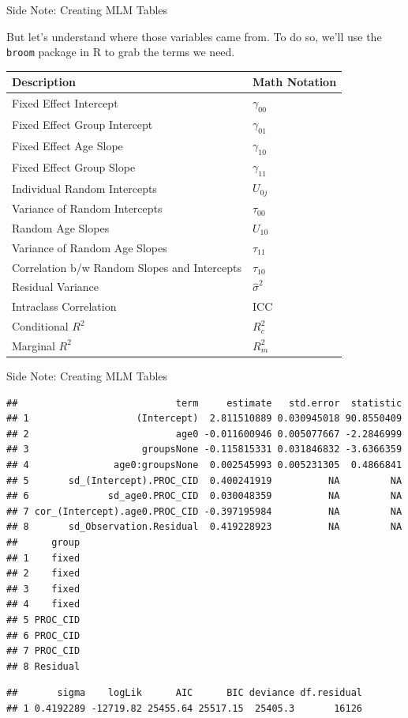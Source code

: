 \begin{frame}[fragile]{Side Note: Creating MLM Tables}

But let's understand where those variables came from. To do so, we'll
use the \texttt{broom} package in R to grab the terms we need.

\begin{longtable}[]{@{}ll@{}}
\toprule
Description & Math Notation\tabularnewline
\midrule
\endhead
Fixed Effect Intercept & \(\gamma_{00}\)\tabularnewline
Fixed Effect Group Intercept & \(\gamma_{01}\)\tabularnewline
Fixed Effect Age Slope & \(\gamma_{10}\)\tabularnewline
Fixed Effect Group Slope & \(\gamma_{11}\)\tabularnewline
Individual Random Intercepts & \(U_{0j}\)\tabularnewline
Variance of Random Intercepts & \(\tau_{00}\)\tabularnewline
Random Age Slopes & \(U_{10}\)\tabularnewline
Variance of Random Age Slopes & \(\tau_{11}\)\tabularnewline
Correlation b/w Random Slopes and Intercepts &
\(\tau_{10}\)\tabularnewline
Residual Variance & \(\hat{\sigma}^2\)\tabularnewline
Intraclass Correlation & ICC\tabularnewline
Conditional \(R^2\) & \(R^2_c\)\tabularnewline
Marginal \(R^2\) & \(R^2_m\)\tabularnewline
\bottomrule
\end{longtable}

\end{frame}

\begin{frame}[fragile]{Side Note: Creating MLM Tables}

\begin{Shaded}
\begin{Highlighting}[]
\OperatorTok{::}
\OperatorTok{::}
\end{Highlighting}
\end{Shaded}

\tiny

\begin{verbatim}
##                            term     estimate   std.error  statistic
## 1                   (Intercept)  2.811510889 0.030945018 90.8550409
## 2                          age0 -0.011600946 0.005077667 -2.2846999
## 3                    groupsNone -0.115815331 0.031846832 -3.6366359
## 4               age0:groupsNone  0.002545993 0.005231305  0.4866841
## 5       sd_(Intercept).PROC_CID  0.400241919          NA         NA
## 6              sd_age0.PROC_CID  0.030048359          NA         NA
## 7 cor_(Intercept).age0.PROC_CID -0.397195984          NA         NA
## 8       sd_Observation.Residual  0.419228923          NA         NA
##      group
## 1    fixed
## 2    fixed
## 3    fixed
## 4    fixed
## 5 PROC_CID
## 6 PROC_CID
## 7 PROC_CID
## 8 Residual
\end{verbatim}

\begin{verbatim}
##       sigma    logLik      AIC      BIC deviance df.residual
## 1 0.4192289 -12719.82 25455.64 25517.15  25405.3       16126
\end{verbatim}

\end{frame}

